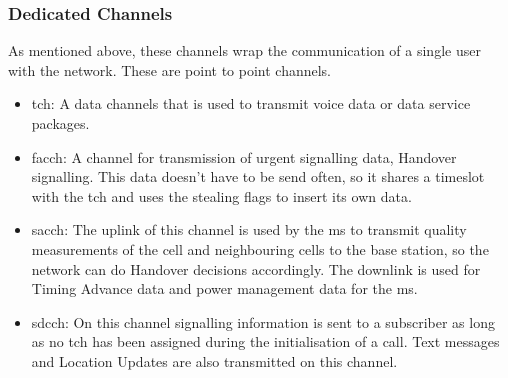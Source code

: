 \subsubsection{Dedicated Channels}
As mentioned above, these channels wrap the communication of a single user with the network.
These are point to point channels.
\begin{itemize}
	\item \gls{tch}: A data channels that is used to transmit voice data or data service packages.
	\item \gls{facch}: A channel for transmission of urgent signalling data, \eg Handover signalling.
	This data doesn't have to be send often, so it shares a timeslot with the \gls{tch} and uses the stealing flags to insert its own data.
	\item \gls{sacch}: The uplink of this channel is used by the \gls{ms} to transmit quality measurements of the cell and neighbouring cells to the base station, so the network can do Handover decisions accordingly.
	The downlink is used for Timing Advance data and power management data for the \gls{ms}.
	\item \gls{sdcch}: On this channel signalling information is sent to a subscriber as long as no \gls{tch} has been assigned during the initialisation of a call.
	Text messages and Location Updates are also transmitted on this channel.
\end{itemize}

